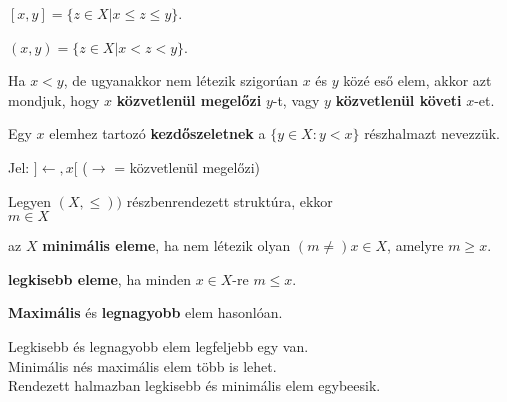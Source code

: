 \begin{frame}
\begin{tcolorbox}[title={Def.: Zárt Intervallum}]
$[x, y] = \{ z \in X | x \leq z \leq y \}$.
\end{tcolorbox}

\begin{tcolorbox}[title={Def.: Nyílt Intervallum}]
$(x, y) = \{ z \in X | x < z < y \}$.
\end{tcolorbox}

\begin{tcolorbox}[title={Def.: Közvetlenü megelőzi, Közvetlenül követi}]
Ha $x < y$, de ugyanakkor nem létezik szigorúan $x$ és $y$ közé eső elem, akkor azt mondjuk, hogy $x$ \textbf{közvetlenül megelőzi} $y$-t, vagy $y$ \textbf{közvetlenül követi} $x$-et.\\
\mmedskip

Egy $x$ elemhez tartozó \textbf{kezdőszeletnek} a $\{ y \in X : y < x \}$ részhalmazt nevezzük.\\
\mmedskip

Jel: $] {\leftarrow}, x [$ ($\rightarrow$ = közvetlenül megelőzi)
\end{tcolorbox}

\begin{tcolorbox}[title={Def.: Minimális, Maximális, Legkisebb, Legnagyobb elem}]
Legyen $(X, {\leq}))$ részbenrendezett struktúra, ekkor\\
$m \in X$\\
\msmallskip

az $X$ \textbf{minimális eleme}, ha nem létezik olyan $(m {\neq}) x \in X$, amelyre $m \geq x$.\\
\mmedskip

\textbf{legkisebb eleme}, ha minden $x \in X$-re $m \leq x$.\\
\mmedskip

\textbf{Maximális} és \textbf{legnagyobb} elem hasonlóan.
\end{tcolorbox}

\begin{tcolorbox}[title={Ész}]
Legkisebb és legnagyobb elem legfeljebb egy van.\\
Minimális nés maximális elem több is lehet.\\
Rendezett halmazban legkisebb és minimális elem egybeesik.
\end{tcolorbox}
\end{frame}

